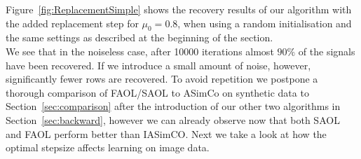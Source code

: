 \documentclass[11pt, onecolumn, journal,compsoc]{IEEEtran}
\theoremstyle{plain}
\theoremstyle{remark}
\begin{document}
Figure~\ref{fig:ReplacementSimple} shows the recovery results of our algorithm with the added replacement step for $\mu_0=0.8$, when using a random initialisation and the same settings as described at the beginning of the section. \\
We see that in the noiseless case, after 10000 iterations almost $90\%$ of the signals have been recovered. If we introduce a small amount of noise, however, significantly fewer rows are recovered. To avoid repetition we postpone a thorough comparison of FAOL/SAOL to ASimCo on synthetic data to Section~\ref{sec:comparison} after the introduction of our other two algorithms in Section~\ref{sec:backward}, however we can already observe now that both SAOL and FAOL perform better than  IASimCO. 
Next we take a look at how the optimal stepsize affects learning on image data.
%

\end{document}

